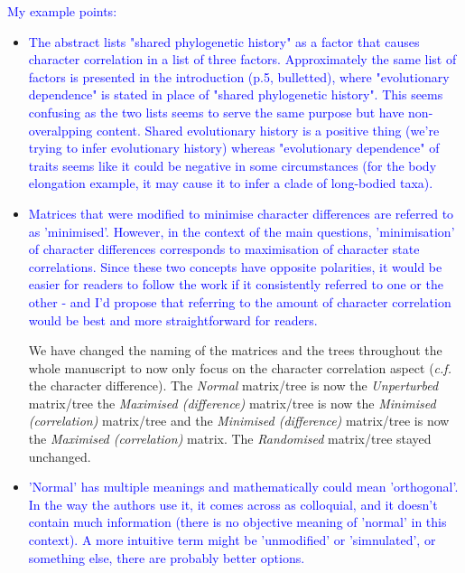 \documentclass[12pt,letterpaper]{article}
\begin{document}
\textcolor{blue}{My example points:}

\begin{itemize}

\item{\textcolor{blue}{The abstract lists "shared phylogenetic history" as a factor that causes character correlation in a list of three factors. Approximately the same list of factors is presented in the introduction (p.5, bulletted), where "evolutionary dependence" is stated in place of "shared phylogenetic history". This seems confusing as the two lists seems to serve the same purpose but have non-overalpping content. Shared evolutionary history is a positive thing (we're trying to infer evolutionary history) whereas "evolutionary dependence" of traits seems like it could be negative in some circumstances (for the body elongation example, it may cause it to infer a clade of long-bodied taxa).}}




\item{\textcolor{blue}{Matrices that were modified to minimise character differences are referred to as 'minimised'. However, in the context of the main questions, 'minimisation' of character differences corresponds to maximisation of character state correlations. Since these two concepts have opposite polarities, it would be easier for readers to follow the work if it consistently referred to one or the other - and I'd propose that referring to the amount of character correlation would be best and more straightforward for readers.}}

We have changed the naming of the matrices and the trees throughout the whole manuscript to now only focus on the character correlation aspect (\textit{c.f.} the character difference). The \textit{Normal} matrix/tree is now the \textit{Unperturbed} matrix/tree the \textit{Maximised (difference)} matrix/tree is now the \textit{Minimised (correlation)} matrix/tree and the \textit{Minimised (difference)} matrix/tree is now the \textit{Maximised (correlation)} matrix. The \textit{Randomised} matrix/tree stayed unchanged.



\item{\textcolor{blue}{'Normal' has multiple meanings and mathematically could mean 'orthogonal'. In the way the authors use it, it comes across as colloquial, and it doesn't contain much information (there is no objective meaning of 'normal' in this context). A more intuitive term might be 'unmodified' or 'simnulated', or something else, there are probably better options.}}


\end{itemize}
\end{document}
